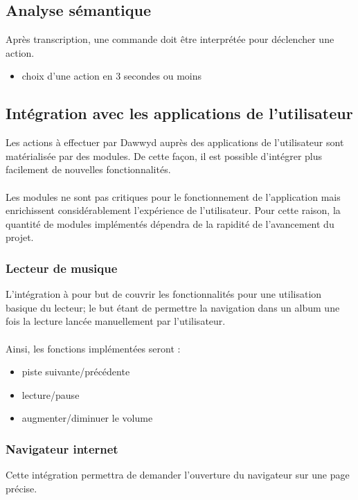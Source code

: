 \documentclass[12pt]{article}
\begin{document}
    \subsection{Analyse sémantique}
    Après transcription, une commande doit être interprétée pour déclencher une
    action.
    \begin{itemize}
        \item choix d'une action en 3 secondes ou moins
    \end{itemize}

    \subsection{Intégration avec les applications de l'utilisateur}
    Les actions à effectuer par Dawwyd auprès des applications de l'utilisateur
    sont matérialisée par des modules. De cette façon, il est possible
    d'intégrer plus facilement de nouvelles fonctionnalités.

    \paragraph{}
    Les modules ne sont pas critiques pour le fonctionnement de l'application
    mais enrichissent considérablement l'expérience de l'utilisateur. Pour
    cette raison, la quantité de modules implémentés dépendra de la rapidité
    de l'avancement du projet.

    \subsubsection{Lecteur de musique}
    L'intégration à pour but de couvrir les fonctionnalités pour une utilisation
    basique du lecteur; le but étant de permettre la navigation dans un album
    une fois la lecture lancée manuellement par l'utilisateur.

    \paragraph{}
    Ainsi, les fonctions implémentées seront :
    \begin{itemize}
        \item piste suivante/précédente
        \item lecture/pause
        \item augmenter/diminuer le volume
    \end{itemize}

    \subsubsection{Navigateur internet}
    Cette intégration permettra de demander l'ouverture du navigateur sur une page
    précise.
\end{document}
